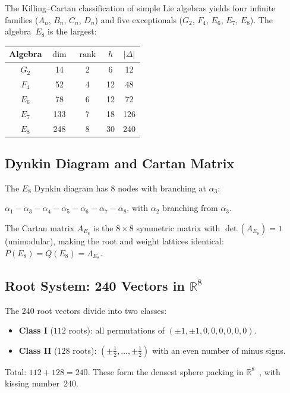 \documentclass[11pt, a4paper]{article}
\theoremstyle{plain}
\theoremstyle{definition}
\theoremstyle{remark}
\DeclareMathOperator{\rank}{rank}
\begin{document}
The Killing--Cartan classification of simple Lie algebras yields four
infinite families ($A_n$, $B_n$, $C_n$, $D_n$) and five exceptionals
($G_2$, $F_4$, $E_6$, $E_7$, $E_8$). The algebra~$E_8$ is the largest:

\begin{center}
\begin{tabular}{@{}ccccc@{}}
\toprule
Algebra & $\dim$ & $\rank$ & $h$ & $|\Delta|$ \\
\midrule
$G_2$   & 14   & 2 & 6  & 12  \\
$F_4$   & 52   & 4 & 12 & 48  \\
$E_6$   & 78   & 6 & 12 & 72  \\
$E_7$   & 133  & 7 & 18 & 126 \\
$E_8$   & 248  & 8 & 30 & 240 \\
\bottomrule
\end{tabular}
\end{center}

\subsection{Dynkin Diagram and Cartan Matrix}

The $E_8$ Dynkin diagram has 8 nodes with branching at $\alpha_3$:

\begin{center}
$\alpha_1 - \alpha_3 - \alpha_4 - \alpha_5 - \alpha_6 -
\alpha_7 - \alpha_8$, \quad with $\alpha_2$ branching from $\alpha_3$.
\end{center}

\noindent The Cartan matrix $A_{E_8}$ is the $8\times 8$ symmetric
matrix with $\det(A_{E_8}) = 1$ (unimodular), making the root and
weight lattices identical: $P(E_8) = Q(E_8) = \Lambda_{E_8}$.

\subsection{Root System: 240 Vectors in $\mathbb{R}^8$}

The 240 root vectors divide into two classes:
\begin{itemize}
  \item \textbf{Class I} ($112$ roots): all permutations of
    $(\pm 1, \pm 1, 0, 0, 0, 0, 0, 0)$.
  \item \textbf{Class II} ($128$ roots):
    $(\pm\tfrac12,\ldots,\pm\tfrac12)$ with an even
    number of minus signs.
\end{itemize}
Total: $112 + 128 = 240$. These form the densest sphere packing in
$\mathbb{R}^8$~\cite{viazovska}, with kissing number~240.
\end{document}
